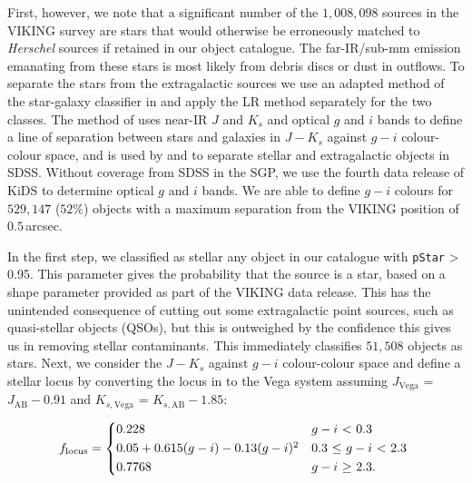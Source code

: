First, however, we note that a significant number of the $1,008,098$ sources in the VIKING survey are stars that would otherwise be erroneously matched to \textit{Herschel} sources if retained in our object catalogue. The far-IR/sub-mm emission emanating from these stars is most likely from debris discs or dust in outflows. To separate the stars from the extragalactic sources we use an adapted method of the star-galaxy classifier in \citealt{Baldry_2010} and apply the LR method separately for the two classes. The method of \citealt{Baldry_2010} uses near-IR $J$ and $K_s$ and optical $g$ and $i$ bands to define a line of separation between stars and galaxies in $J - K_s$ against $g - i$ colour-colour space, and is used by \citealt{Bourne_2016} and \citealt{Furlanetto_2018} to separate stellar and extragalactic objects in SDSS. Without coverage from SDSS in the SGP, we use the fourth data release of KiDS to determine optical $g$ and $i$ bands. We are able to define $g - i$ colours for $529,147$ ($52\%$) objects with a maximum separation from the VIKING position of $0.5\,$arcsec.

In the first step, we classified as stellar any object in our catalogue with \texttt{pStar} > 0.95. This parameter gives the probability that the source is a star, based on a shape parameter provided as part of the VIKING data release. This has the unintended consequence of cutting out some extragalactic point sources, such as quasi-stellar objects (QSOs), but this is outweighed by the confidence this gives us in removing stellar contaminants. This immediately classifies $51,508$ objects as stars. Next, we consider the $J - K_s$ against $g - i$ colour-colour space and define a stellar locus by converting the locus in \citealt{Baldry_2010} to the Vega system assuming $J_{\textrm{Vega}}$ = $J_{\textrm{AB}} - 0.91$ and $K_{s,\textrm{Vega}}$ = $K_{s,\textrm{AB}} - 1.85$:

\begin{equation}
    f_{\textrm{locus}} = 
    \begin{cases*}
        0.228 & $g-i$ < 0.3 \\
        0.05 + 0.615(g-i) - 0.13(g-i)^2 & 0.3 $\leq$ $g-i$ < 2.3 \\
        0.7768 & $g-i$ $\geq$ 2.3.
    \end{cases*}
\label{eq:stellar_locus}
\end{equation}

